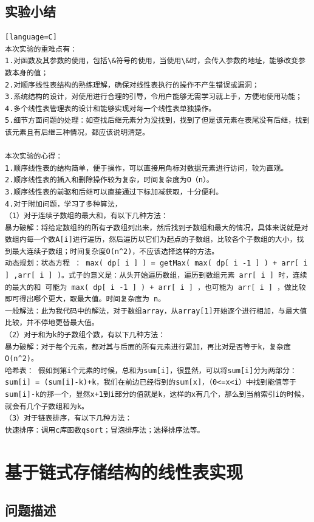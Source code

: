 \documentclass[supercite]{Experimental_Report}
\theoremstyle{definition}
\begin{document}
\begin{sloppypar}
\subsection{实验小结}
\begin{lstlisting}[breaklines][language=C]
本次实验的重难点有：
1.对函数及其参数的使用，包括\&符号的使用，当使用\&时，会传入参数的地址，能够改变参数本身的值；
2.对顺序线性表结构的熟练理解，确保对线性表执行的操作不产生错误或漏洞；
3.系统结构的设计，对使用进行合理的引导，令用户能够无需学习就上手，方便地使用功能；
4.多个线性表管理表的设计和能够实现对每一个线性表单独操作。
5.细节方面问题的处理：如查找后继元素分为没找到，找到了但是该元素在表尾没有后继，找到该元素且有后继三种情况，都应该说明清楚。

本次实验的心得：
1.顺序线性表的结构简单，便于操作，可以直接用角标对数据元素进行访问，较为直观。
2.顺序线性表的插入和删除操作较为复杂，时间复杂度为O（n）。
3.顺序线性表的前驱和后继可以直接通过下标加减获取，十分便利。
4.对于附加问题，学习了多种算法，
（1）对于连续子数组的最大和，有以下几种方法：
暴力破解：将给定数组的的所有子数组列出来，然后找到子数组和最大的情况，具体来说就是对数组内每一个数A[i]进行遍历，然后遍历以它们为起点的子数组，比较各个子数组的大小，找到最大连续子数组；时间复杂度O(n^2)，不应该选择这样的方法。
动态规划：状态方程 ： max( dp[ i ] ) = getMax( max( dp[ i -1 ] ) + arr[ i ] ,arr[ i ] )。式子的意义是：从头开始遍历数组，遍历到数组元素 arr[ i ] 时，连续的最大的和 可能为 max( dp[ i -1 ] ) + arr[ i ] ，也可能为 arr[ i ] ，做比较即可得出哪个更大，取最大值。时间复杂度为 n。
一般解法：此为我代码中的解法，对于数组array，从array[1]开始逐个进行相加，与最大值比较，并不停地更替最大值。
（2）对于和为k的子数组个数，有以下几种方法：
暴力破解：对于每个元素，都对其与后面的所有元素进行累加，再比对是否等于k，复杂度O(n^2)。
哈希表： 假如到第i个元素的时候，总和为sum[i]，很显然，可以将sum[i]分为两部分：sum[i] = (sum[i]-k)+k，我们在前边已经得到的sum[x]，（0<=x<i）中找到能值等于sum[i]-k的那一个，显然x+1到i部分的值就是k，这样的x有几个，那么到当前索引i的时候，就会有几个子数组和为k。
（3）对于链表排序，有以下几种方法：
快速排序：调用c库函数qsort；冒泡排序法；选择排序法等。
\end{lstlisting}

\section{基于链式存储结构的线性表实现}

\subsection{问题描述}


\end{sloppypar}
\end{document}
